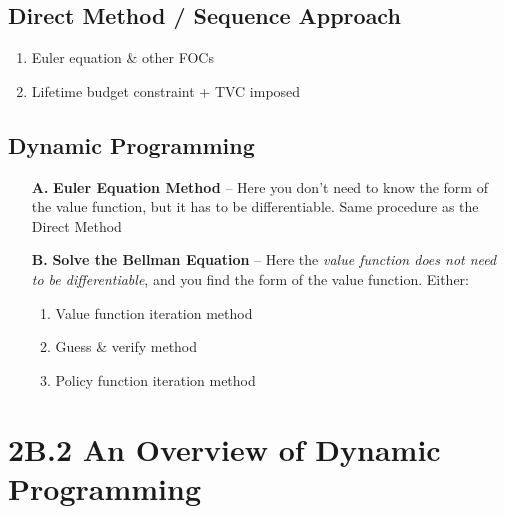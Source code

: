 \documentclass[12pt]{article}
\begin{document}
\subsection*{\noindent\textbf{Direct Method / Sequence Approach}}

\begin{enumerate}
    \item Euler equation \& other FOCs
    \item Lifetime budget constraint + TVC imposed
\end{enumerate}

\vspace{0.5cm}

\subsection*{\noindent\textbf{Dynamic Programming}}

\begin{enumerate}
    \item[\textbf{A.}] \textbf{Euler Equation Method} – Here you don’t need to know the form of the value function, but it has to be differentiable. Same procedure as the Direct Method
    \item[\textbf{B.}] \textbf{Solve the Bellman Equation} – Here the \textit{value function does not need to be differentiable}, and you find the form of the value function. Either:
    \begin{enumerate}
        \item Value function iteration method
        \item Guess \& verify method
        \item Policy function iteration method
    \end{enumerate}
\end{enumerate}

\section*{\noindent\textbf{2B.2 An Overview of Dynamic Programming}}
\end{document}
